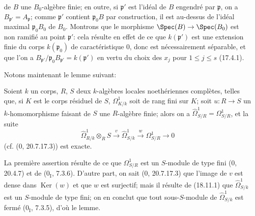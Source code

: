 
de $B$ une $B_0$-algèbre finie; en outre, si $\mathfrak p'$ est l'idéal de $B$ engendré par $\mathfrak p$, on a $B_{\mathfrak p'}=A_{\mathfrak p}$; comme $\mathfrak p'$ contient $\mathfrak p_0B$ par construction, il est au-dessus de l'idéal maximal $\mathfrak p_0B_0$ de $B_0$. Montrons que le morphisme $\Spec(B)\to\Spec(B_0)$ est non ramifié au point $\mathfrak p'$: cela résulte en effet de ce que $k(\mathfrak p')$ est une extension finie du corps $k(\mathfrak p_0)$ de caractéristique 0, donc est nécessairement séparable, et que l'on a $B_{\mathfrak p'}/\mathfrak p_0B_{\mathfrak p'}=k(\mathfrak p')$ en vertu du choix des $x_j$ pour $1\leq j\leq s$ (17.4.1).

Notons maintenant le lemme suivant:

\begin{lemma}[18.11.3.5]
\label{IV.18.11.3.5}
Soient $k$ un corps, $R$, $S$ deux $k$-algèbres locales noethériennes complètes, telles que, si $K$ est le corps résiduel de $S$, $\Omega^1_{K/k}$ soit de rang fini sur $K$; soit $u:R\to S$ un $k$-homomorphisme faisant de $S$ une $R$-algèbre finie; alors on a $\hat{\Omega}^1_{S/R}=\Omega^1_{S/R}$, et la suite
\begin{equation}
\label{IV.18.11.3.6}
\tag{18.11.3.6}
  \hat{\Omega}^1_{R/k}\otimes_R S\xrightarrow{v}\hat{\Omega}^1_{S/k}\xrightarrow{w}\Omega^1_{S/R}\to0
\end{equation}
(cf. (0, 20.7.17.3)) est exacte.
\end{lemma}

La première assertion résulte de ce que $\Omega^1_{S/R}$ est un $S$-module de type fini (0, 20.4.7) et de ($0_{\mathrm I}$, 7.3.6). D'autre part, on sait (0, 20.7.17.3) que l'image de $v$ est dense dans $\operatorname{Ker}(w)$ et que $w$ est surjectif; mais il résulte de (18.11.1) que $\hat{\Omega}^1_{S/k}$ est un $S$-module de type fini; on en conclut que tout sous-$S$-module de $\hat{\Omega}^1_{S/k}$ est fermé ($0_{\mathrm I}$, 7.3.5), d'où le lemme.

